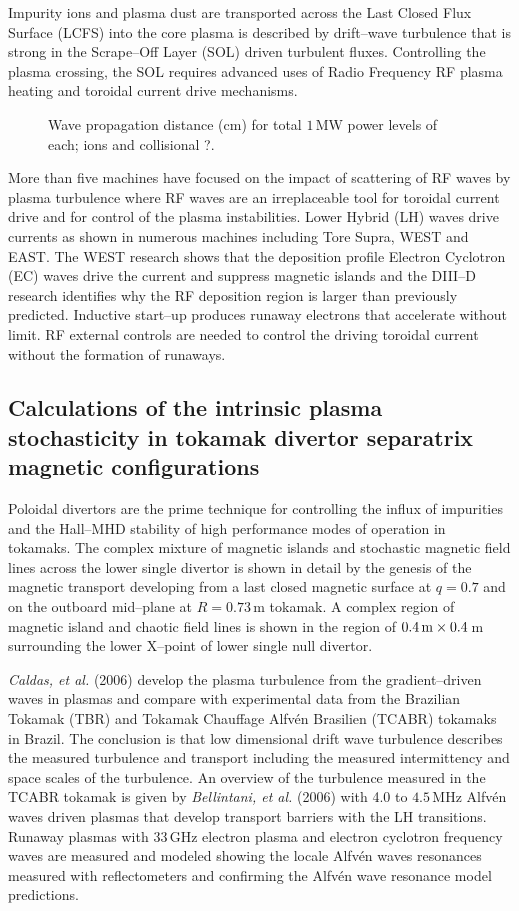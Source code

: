 \documentclass[a4paper,openany,12pt]{book}
\begin{document}
Impurity ions and plasma dust are transported across the Last Closed Flux Surface (LCFS) into the core plasma is described by drift--wave turbulence that is strong in the Scrape--Off Layer (SOL) driven turbulent fluxes. Controlling the plasma crossing, the SOL requires advanced uses of Radio Frequency RF plasma heating and toroidal current drive mechanisms.
%
\begin{figure}[H]
\centerline{}
\caption{Wave propagation distance (cm) for total $1\,$MW power levels of each; ions and collisional ?.}
\label{F3.10}
\end{figure}
%

More than five machines have focused on the impact of scattering of RF waves by plasma turbulence where RF waves are an irreplaceable tool for toroidal current drive and for control of the plasma instabilities. Lower Hybrid (LH) waves drive currents as shown in numerous machines including Tore Supra, WEST and EAST. The WEST research shows that the deposition profile Electron Cyclotron (EC) waves drive the current and suppress magnetic islands and the DIII--D research identifies why the RF deposition region is larger than previously predicted. Inductive start--up produces runaway electrons that accelerate without limit. RF external controls are needed to control the driving toroidal current without the formation of runaways.

\subsection{Calculations of the intrinsic plasma stochasticity in tokamak divertor separatrix magnetic configurations}

Poloidal divertors are the prime technique for controlling the influx of impurities and the Hall--MHD stability of high performance modes of operation in tokamaks. The complex mixture of magnetic islands and stochastic magnetic field lines across the lower single divertor is shown in detail by the genesis of the magnetic transport developing from a last closed magnetic surface at $q=0.7$ and on the outboard mid--plane at $R=0.73\,$m tokamak. A complex region of magnetic island and chaotic field lines is shown in the region of $0.4\,\rm m\times 0.4\,$m surrounding the lower
X--point of lower single null divertor.

\emph{Caldas, et al.} (2006) develop the plasma turbulence from the gradient--driven waves in plasmas and compare with experimental data from the Brazilian Tokamak (TBR) and Tokamak Chauffage Alfv\'en Brasilien (TCABR) tokamaks in Brazil. The conclusion is that low dimensional drift wave turbulence describes the measured turbulence and transport including the measured intermittency and space scales of the turbulence. An overview of the turbulence measured in the TCABR tokamak is given by \emph{Bellintani, et al.} (2006) with 4.0 to $4.5\,$MHz Alfv\'en waves driven plasmas that develop transport barriers with the LH transitions. Runaway plasmas with $33\,$GHz electron plasma and electron cyclotron frequency waves are measured and modeled showing the locale Alfv\'en waves resonances measured with reflectometers and confirming the Alfv\'en wave resonance model predictions.
\end{document}
